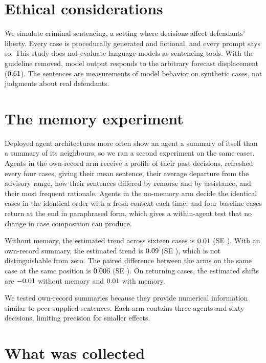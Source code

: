 \appendix
\raggedbottom
\makeatletter
\renewcommand{\theHfigure}{appendix.\thefigure}
\renewcommand{\theHtable}{appendix.\thetable}
\makeatother
\section{Ethical considerations}

We simulate criminal sentencing, a setting where decisions affect defendants' liberty. Every case is
procedurally generated and fictional, and every prompt says so. This study does not evaluate language
models as sentencing tools. With the guideline removed, model output responds to the arbitrary
forecast displacement ($0.61$). The sentences are measurements of model behavior on synthetic
cases, not judgments about real defendants.

\section{The memory experiment}
\label{app:memory}

Deployed agent architectures more often show an agent a summary of itself than a summary of
its neighbours, so we ran a second experiment on the same cases. Agents in the
own-record arm receive a profile of their past decisions, refreshed every four
cases, giving their mean sentence, their average departure from the advisory range, how their
sentences differed by remorse and by assistance, and their most frequent rationale. Agents in
the no-memory arm decide the identical cases in the identical order with a fresh
context each time, and four baseline cases return at the end in paraphrased form, which gives
a within-agent test that no change in case composition can produce.

Without memory, the estimated trend across sixteen cases is $0.01$ (SE \driftNose). With an
own-record summary, the estimated trend is $0.09$ (SE \driftOwnse), which is not distinguishable
from zero. The paired difference between the arms on the same case at the same position is
$0.006$ (SE \armgapse). On returning cases, the estimated shifts are $-0.01$ without memory
and $0.01$ with memory.

We tested own-record summaries because they provide numerical information similar to peer-supplied
sentences. Each arm contains three agents and sixty decisions, limiting precision for smaller effects.

\section{What was collected}
\label{app:census}

